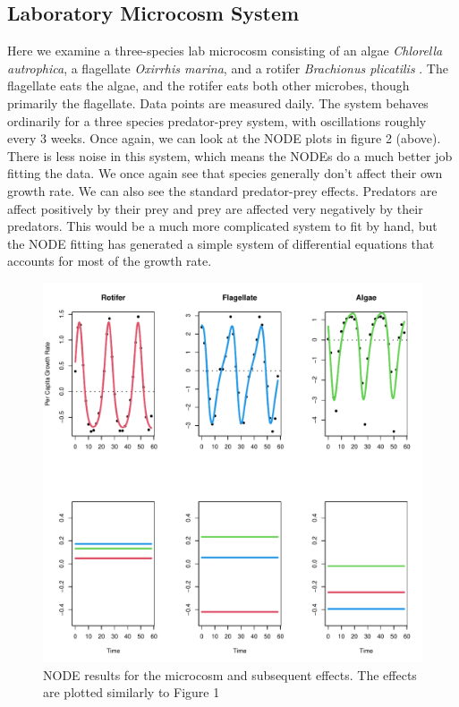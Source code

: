 \documentclass{article}
\begin{document}
\subsection{Laboratory Microcosm System}
Here we examine a three-species lab microcosm consisting of an algae \textit{Chlorella autrophica}, a flagellate \textit{Oxirrhis marina}, and a rotifer \textit{Brachionus plicatilis} \cite{tritropicpaper}. The flagellate eats the algae, and the rotifer eats both other microbes, though primarily the flagellate. Data points are measured daily. The system behaves ordinarily for a three species predator-prey system, with oscillations roughly every 3 weeks. Once again, we can look at the NODE plots in figure 2 (above). There is less noise in this system, which means the NODEs do a much better job fitting the data. We once again see that species generally don't affect their own growth rate. We can also see the standard predator-prey effects. Predators are affect positively by their prey and prey are affected very negatively by their predators. This would be a much more complicated system to fit by hand, but the NODE fitting has generated a simple system of differential equations that accounts for most of the growth rate.
\begin{figure}
\begin{center}
\centerline{\includegraphics[width=\columnwidth]{tritropicplot}}
\caption{
NODE results for the microcosm and subsequent effects. The effects are plotted similarly to Figure 1
}
\end{center}
\end{figure}
\end{document}
